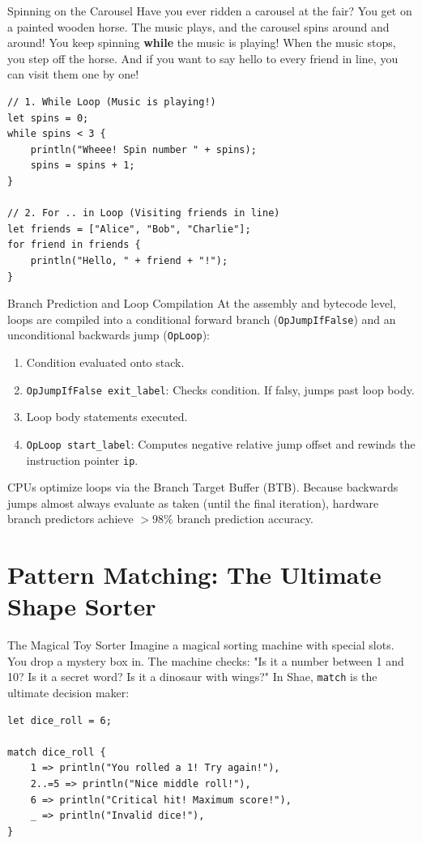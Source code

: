 \begin{kidbox}{Spinning on the Carousel}
Have you ever ridden a carousel at the fair?
You get on a painted wooden horse. The music plays, and the carousel spins around and around!
You keep spinning \textbf{while} the music is playing!
When the music stops, you step off the horse.
And if you want to say hello to every friend in line, you can visit them one by one!
\begin{lstlisting}[language=shaelang]
// 1. While Loop (Music is playing!)
let spins = 0;
while spins < 3 {
    println("Wheee! Spin number " + spins);
    spins = spins + 1;
}

// 2. For .. in Loop (Visiting friends in line)
let friends = ["Alice", "Bob", "Charlie"];
for friend in friends {
    println("Hello, " + friend + "!");
}
\end{lstlisting}
\end{kidbox}

\begin{deepbox}{Branch Prediction and Loop Compilation}
At the assembly and bytecode level, loops are compiled into a conditional forward branch (\texttt{OpJumpIfFalse}) and an unconditional backwards jump (\texttt{OpLoop}):
\begin{enumerate}
    \item Condition evaluated onto stack.
    \item \texttt{OpJumpIfFalse exit\_label}: Checks condition. If falsy, jumps past loop body.
    \item Loop body statements executed.
    \item \texttt{OpLoop start\_label}: Computes negative relative jump offset and rewinds the instruction pointer \texttt{ip}.
\end{enumerate}
CPUs optimize loops via the Branch Target Buffer (BTB). Because backwards jumps almost always evaluate as taken (until the final iteration), hardware branch predictors achieve $>98\%$ branch prediction accuracy.
\end{deepbox}

\section{Pattern Matching: The Ultimate Shape Sorter}

\begin{kidbox}{The Magical Toy Sorter}
Imagine a magical sorting machine with special slots.
You drop a mystery box in. The machine checks:
"Is it a number between 1 and 10? Is it a secret word? Is it a dinosaur with wings?"
In Shae, \texttt{match} is the ultimate decision maker:
\begin{lstlisting}[language=shaelang]
let dice_roll = 6;

match dice_roll {
    1 => println("You rolled a 1! Try again!"),
    2..=5 => println("Nice middle roll!"),
    6 => println("Critical hit! Maximum score!"),
    _ => println("Invalid dice!"),
}
\end{lstlisting}
\end{kidbox}

